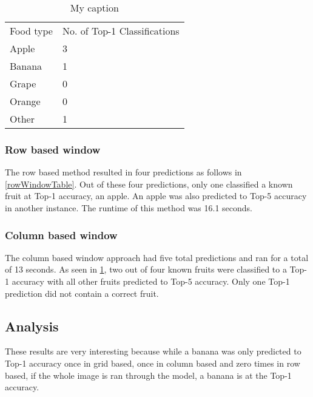 \begin{table}[]
	\centering
	\caption{My caption}
	\label{colWindowTable}
	\begin{tabular}{ll}
		Food type & No. of Top-1 Classifications \\
		Apple     & 3                      \\
		Banana    & 1                      \\
		Grape     & 0                      \\
		Orange    & 0                      \\
		Other     & 1                     
	\end{tabular}
\end{table}

\subsubsection*{Row based window}
The row based method resulted in four predictions as follows in
\ref{rowWindowTable}. Out of these four predictions, only one classified a known
fruit at Top-1 accuracy, an apple. An apple was also predicted to Top-5 accuracy
in another instance. The runtime of this method was 16.1 seconds.

\subsubsection*{Column based window}
The column based window approach had five total predictions and ran for a total
of 13 seconds. As seen in \ref{colWindowTable}, two out of four known fruits
were classified to a Top-1 accuracy with all other fruits predicted to Top-5
accuracy. Only one Top-1 prediction did not contain a correct fruit.

\subsection*{Analysis}
These results are very interesting because while a banana was only predicted to
Top-1 accuracy once in grid based, once in column based and zero times in row
based, if the whole image is ran through the model, a banana is at the Top-1 accuracy.
























